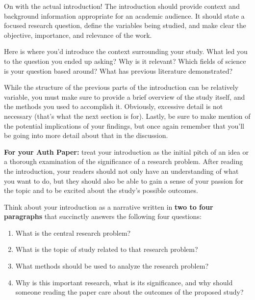\documentclass[10pt,twocolumn,letterpaper]{article}
\begin{document}
On with the actual introduction! The introduction should provide context and background information appropriate for an academic audience. It should state a focused research question, define the variables being studied, and make clear the objective, importance, and relevance of the work.

Here is where you'd introduce the context surrounding your study. What led you to the question you ended up asking? Why is it relevant? Which fields of science is your question based around? What has previous literature demonstrated?

While the structure of the previous parts of the introduction can be relatively variable, you must make sure to provide a brief overview of the study itself, and the methods you used to accomplish it. Obviously, excessive detail is not necessary (that's what the next section is for). Lastly, be sure to make mention of the potential implications of your findings, but once again remember that you'll be going into more detail about that in the discussion.

\textbf{For your Auth Paper:} treat your introduction as the initial pitch of an idea or a thorough examination of the significance of a research problem. After reading the introduction, your readers should not only have an understanding of what you want to do, but they should also be able to gain a sense of your passion for the topic and to be excited about the study's possible outcomes.

Think about your introduction as a narrative written in \textbf{two to four paragraphs} that succinctly answers the following four questions:
\begin{enumerate}
   \item What is the central research problem?
   \item What is the topic of study related to that research problem?
    \item What methods should be used to analyze the research problem?
   \item Why is this important research, what is its significance, and why should someone reading the paper care about the outcomes of the proposed study?
\end{enumerate}
\end{document}
